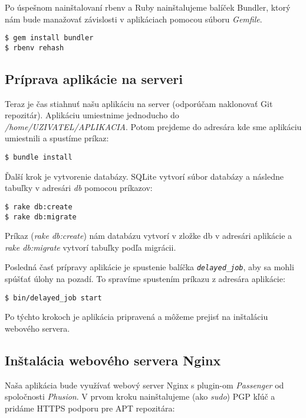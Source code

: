 Po úspešnom nainštalovaní rbenv a Ruby nainštalujeme balíček Bundler, ktorý nám bude manažovať závislosti v aplikáciach pomocou súboru \emph{Gemfile}.

\begin{verbatim}
$ gem install bundler
$ rbenv rehash
\end{verbatim}

\clearpage
\subsection*{Príprava aplikácie na serveri}

Teraz je čas stiahnuť našu aplikáciu na server (odporúčam naklonovať Git repozitár). Aplikáciu umiestnime jednoducho do \emph{/home/UZIVATEL/APLIKACIA}. Potom prejdeme do adresára kde sme aplikáciu umiestnili a spustíme príkaz:

\begin{verbatim}
$ bundle install
\end{verbatim}

Ďalší krok je vytvorenie databázy. SQLite vytvorí súbor databázy a následne tabuľky v adresári \emph{db} pomocou príkazov:

\begin{verbatim}
$ rake db:create
$ rake db:migrate
\end{verbatim}

Príkaz (\emph{rake db:create}) nám databázu vytvorí v zložke db v adresári aplikácie a \emph{rake db:migrate} vytvorí tabuľky podľa migrácii.

Posledná časť prípravy aplikácie je spustenie balíčka \emph{\texttt{delayed\_job}}, aby sa mohli spúšťať úlohy na pozadí. To spravíme spustením príkazu z adresára aplikácie:

\begin{verbatim}
$ bin/delayed_job start
\end{verbatim}

Po týchto krokoch je aplikácia pripravená a môžeme prejisť na inštaláciu webového servera.

\subsection*{Inštalácia webového servera Nginx}

Naša aplikácia bude využívať webový server Nginx s plugin-om \emph{Passenger} od spoločnosti \emph{Phusion}. V prvom kroku nainštalujeme (ako \emph{sudo}) PGP kľúč a pridáme HTTPS podporu pre APT repozitára:

